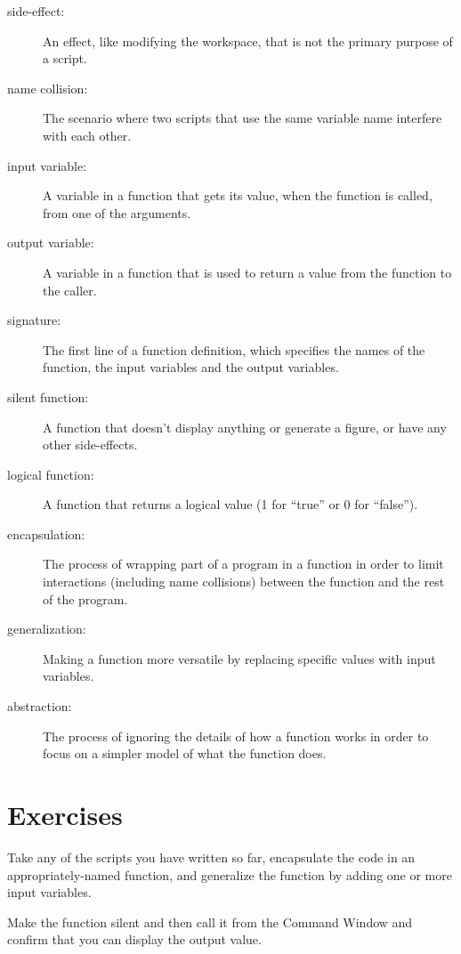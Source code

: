 \begin{description}

\item[side-effect:] An effect, like modifying the workspace, that
is not the primary purpose of a script.

\item[name collision:] The scenario where two scripts that use the
same variable name interfere with each other.

\item[input variable:] A variable in a function that gets its value,
when the function is called, from one of the arguments.

\item[output variable:] A variable in a function that is used to
return a value from the function to the caller.

\item[signature:] The first line of a function definition, which
specifies the names of the function, the input variables and the
output variables.

\item[silent function:] A function that doesn't display anything
or generate a figure, or have any other side-effects.

\item[logical function:] A function that returns a logical value
(1 for ``true'' or 0 for ``false'').

\item[encapsulation:] The process of wrapping part of a program in
a function in order to limit interactions (including name collisions)
between the function and the rest of the program.

\item[generalization:] Making a function more versatile by replacing
specific values with input variables.

\item[abstraction:] The process of ignoring the details of how
a function works in order to focus on a simpler model of what the
function does.

\end{description}

\section{Exercises}

\begin{ex}
Take any of the scripts you have written so far, encapsulate
the code in an appropriately-named function, and generalize
the function by adding one or more input variables.

Make the function silent and then call it from the Command
Window and confirm that you can display the output value.
\end{ex}
